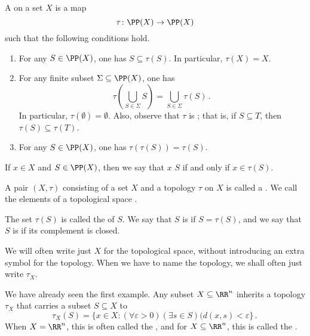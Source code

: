 \begin{dfn}
	A  on a set $X$ is a map%
	\[
		\tau \colon \PP(X) \to \PP(X)
	\]
	such that the following conditions hold.
	\begin{enumerate}
		\item For any $ S \in \PP(X) $, one has $ S \subseteq \tau(S) $.
		In particular, $ \tau(X) = X $.
		\item For any finite subset $ \Sigma \subseteq \PP(X) $, one has
		\[
			\tau \left( \bigcup_{ S \in \Sigma} S \right) = \bigcup_{ S \in \Sigma } \tau(S) \period
		\]
		In particular,%
		$ \tau (\emptyset) = \emptyset $.
		Also, observe that $\tau$ is ;
		that is, if $S \subseteq T$, then $\tau(S) \subseteq \tau(T)$.
		\item For any $ S \in \PP(X) $, one has $ \tau( \tau( S ) ) = \tau( S )$.
	\end{enumerate}

	If $ x \in X $ and $ S \in \PP(X) $, then we say that $ x $  $ S $ if and only if $ x \in \tau(S) $.

	A pair $ (X, \tau) $ consisting of a set $ X $ and a topology $ \tau $ on $ X $ is called a .
	We call the elements of a topological space .

	The set $\tau(S)$ is called the  of $ S $.
	We say that $ S $ is  if $ S = \tau( S ) $, and we say that $ S $ is  if its complement is closed.%
\end{dfn}

\begin{ntn}
	We will often write just $X$ for the topological space, without introducing an extra symbol for the topology.
	When we have to name the topology, we shall often just write $\tau_X$.
\end{ntn}

\begin{exm}
	We have already seen the first example.
	Any subset $X \subseteq \RR^n$ inherits a topology $\tau_X$ that carries a subset $S \subseteq X$ to 
	\[
		\tau_X(S) = \{ x\in X : (\forall \varepsilon>0)(\exists s \in S)(d(x,s)<\varepsilon\} \period
	\]
	When $X=\RR^n$, this is often called the ,
	and for $X \subseteq \RR^n$, this is called the .
\end{exm}

